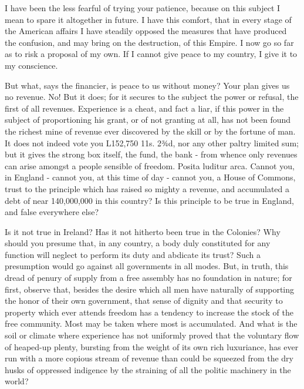 I have been the less fearful of trying your patience, because on this subject I mean to spare it altogether in future. I have this comfort, that in every stage of the American affairs I have steadily opposed the measures that have produced the confusion, and may bring on the destruction, of this Empire. I now go so far as to risk a proposal of my own. If I cannot give peace to my country, I give it to my conscience.\par

But what, says the financier, is peace to us without money? Your plan gives us no revenue. No! But it does; for it secures to the subject the power or refusal, the first of all revenues. Experience is a cheat, and fact a liar, if this power in the subject of proportioning his grant, or of not granting at all, has not been found the richest mine of revenue ever discovered by the skill or by the fortune of man. It does not indeed vote you L152,750 11s. 2¾d, nor any other paltry limited sum; but it gives the strong box itself, the fund, the bank - from whence only revenues can arise amongst a people sensible of freedom. Posita luditur arca. Cannot you, in England - cannot you, at this time of day - cannot you, a House of Commons, trust to the principle which has raised so mighty a revenue, and accumulated a debt of near 140,000,000 in this country? Is this principle to be true in England, and false everywhere else?\par

Is it not true in Ireland? Has it not hitherto been true in the Colonies? Why should you presume that, in any country, a body duly constituted for any function will neglect to perform its duty and abdicate its trust? Such a presumption would go against all governments in all modes. But, in truth, this dread of penury of supply from a free assembly has no foundation in nature; for first, observe that, besides the desire which all men have naturally of supporting the honor of their own government, that sense of dignity and that security to property which ever attends freedom has a tendency to increase the stock of the free community. Most may be taken where most is accumulated. And what is the soil or climate where experience has not uniformly proved that the voluntary flow of heaped-up plenty, bursting from the weight of its own rich luxuriance, has ever run with a more copious stream of revenue than could be squeezed from the dry husks of oppressed indigence by the straining of all the politic machinery in the world?\par


